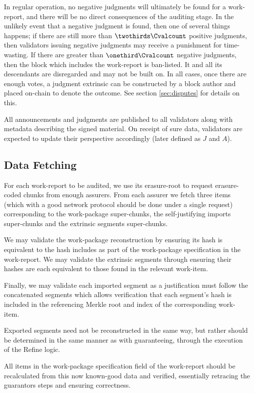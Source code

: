 In regular operation, no negative judgments will ultimately be found for a work-report, and there will be no direct consequences of the auditing stage. In the unlikely event that a negative judgment is found, then one of several things happens; if there are still more than $\twothirds\Cvalcount$ positive judgments, then validators issuing negative judgments may receive a punishment for time-wasting. If there are greater than $\onethird\Cvalcount$ negative judgments, then the block which includes the work-report is ban-listed. It and all its descendants are disregarded and may not be built on. In all cases, once there are enough votes, a judgment extrinsic can be constructed by a block author and placed on-chain to denote the outcome. See section \ref{sec:disputes} for details on this.

All announcements and judgments are published to all validators along with metadata describing the signed material. On receipt of sure data, validators are expected to update their perspective accordingly (later defined as $J$ and $A$).

\subsection{Data Fetching}

For each work-report to be audited, we use its erasure-root to request erasure-coded chunks from enough assurers. From each assurer we fetch three items (which with a good network protocol should be done under a single request) corresponding to the work-package super-chunks, the self-justifying imports super-chunks and the extrinsic segments super-chunks.

We may validate the work-package reconstruction by ensuring its hash is equivalent to the hash includes as part of the work-package specification in the work-report. We may validate the extrinsic segments through ensuring their hashes are each equivalent to those found in the relevant work-item.

Finally, we may validate each imported segment as a justification must follow the concatenated segments which allows verification that each segment's hash is included in the referencing Merkle root and index of the corresponding work-item.

Exported segments need not be reconstructed in the same way, but rather should be determined in the same manner as with guaranteeing, \ie through the execution of the Refine logic.

All items in the work-package specification field of the work-report should be recalculated from this now known-good data and verified, essentially retracing the guarantors steps and ensuring correctness.

